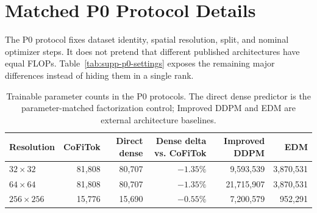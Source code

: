 \documentclass[letterpaper]{article}
\newcommand{\method}{CoFiTok}
\begin{document}
\section{Matched P0 Protocol Details}

The P0 protocol fixes dataset identity, spatial resolution, split, and nominal
optimizer steps. It does not pretend that different published architectures
have equal FLOPs. Table~\ref{tab:supp-p0-settings} exposes the remaining major
differences instead of hiding them in a single rank.

\begin{table}[t]
  \centering
  \scriptsize
  \caption{Locked P0 short-budget settings. C = \method; D = direct dense; E = endpoint-only factorized. NFE is listed in the order C/D/Improved-DDPM/EDM.}
  \label{tab:supp-p0-settings}
\end{table}

\begin{table}[t]
  \centering
  \scriptsize
  \caption{Trainable parameter counts in the P0 protocols. The direct dense predictor is the parameter-matched factorization control; Improved DDPM and EDM are external architecture baselines.}
  \label{tab:supp-parameter-counts}
  \begin{tabular}{lrrrrr}
    \toprule
    Resolution & \method & Direct dense & Dense delta vs. \method & Improved DDPM & EDM \\
    \midrule
    $32\times32$ & 81,808 & 80,707 & $-1.35\%$ & 9,593,539 & 3,870,531 \\
    $64\times64$ & 81,808 & 80,707 & $-1.35\%$ & 21,715,907 & 3,870,531 \\
    $256\times256$ & 15,776 & 15,690 & $-0.55\%$ & 7,200,579 & 952,291 \\
    \bottomrule
  \end{tabular}
\end{table}
\end{document}
